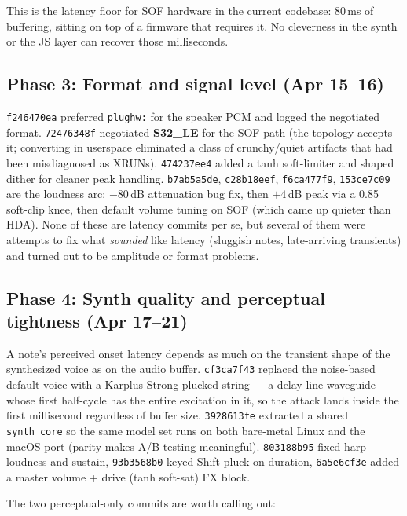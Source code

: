 \documentclass[10pt,letterpaper,twocolumn]{article}
\begin{document}
This is the latency floor for SOF hardware in the current codebase: 80\,ms of buffering, sitting on top of a firmware that requires it. No cleverness in the synth or the JS layer can recover those milliseconds.

\subsection{Phase 3: Format and signal level (Apr 15--16)}

\texttt{f246470ea} preferred \texttt{plughw:} for the speaker PCM and logged the negotiated format. \texttt{72476348f} negotiated \textbf{S32\_LE} for the SOF path (the topology accepts it; converting in userspace eliminated a class of crunchy/quiet artifacts that had been misdiagnosed as XRUNs). \texttt{474237ee4} added a tanh soft-limiter and shaped dither for cleaner peak handling. \texttt{b7ab5a5de}, \texttt{c28b18eef}, \texttt{f6ca477f9}, \texttt{153ce7c09} are the loudness arc: $-80$\,dB attenuation bug fix, then $+4$\,dB peak via a 0.85 soft-clip knee, then default volume tuning on SOF (which came up quieter than HDA). None of these are latency commits per se, but several of them were attempts to fix what \emph{sounded} like latency (sluggish notes, late-arriving transients) and turned out to be amplitude or format problems.

\subsection{Phase 4: Synth quality and perceptual tightness (Apr 17--21)}

A note's perceived onset latency depends as much on the transient shape of the synthesized voice as on the audio buffer. \texttt{cf3ca7f43} replaced the noise-based default voice with a Karplus-Strong plucked string --- a delay-line waveguide whose first half-cycle has the entire excitation in it, so the attack lands inside the first millisecond regardless of buffer size. \texttt{3928613fe} extracted a shared \texttt{synth\_core} so the same model set runs on both bare-metal Linux and the macOS port (parity makes A/B testing meaningful). \texttt{803188b95} fixed harp loudness and sustain, \texttt{93b3568b0} keyed Shift-pluck on duration, \texttt{6a5e6cf3e} added a master volume + drive (tanh soft-sat) FX block.

The two perceptual-only commits are worth calling out:
\end{document}

